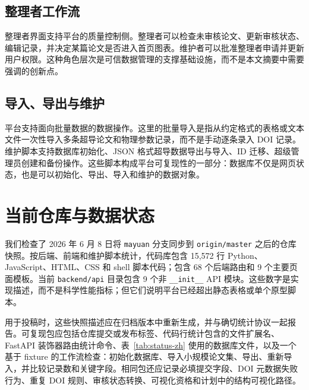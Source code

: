 \documentclass[11pt,a4paper]{ctexart}
\begin{document}
\subsection{整理者工作流}

整理者界面支持平台的质量控制侧。整理者可以检查未审核论文、更新审核状态、编辑记录，并决定某篇论文是否进入首页图表。维护者可以批准整理者申请并更新用户权限。这种角色层次是可信数据管理的支撑基础设施，而不是本文摘要中需要强调的创新点。

\subsection{导入、导出与维护}

平台支持面向批量数据的数据操作。这里的批量导入是指从约定格式的表格或文本文件一次性导入多条超导论文和物理参数记录，而不是手动逐条录入 DOI 记录。维护脚本支持数据库初始化、JSON 格式超导数据导出与导入、ID 迁移、超级管理员创建和备份操作。这些脚本构成平台可复现性的一部分：数据库不仅是网页状态，也是可以初始化、导出、导入和维护的数据对象。

\section{当前仓库与数据状态}

我们检查了 2026 年 6 月 8 日将 \texttt{mayuan} 分支同步到 \texttt{origin/master} 之后的仓库快照。按后端、前端和维护脚本统计，代码库包含 15,572 行 Python、JavaScript、HTML、CSS 和 shell 脚本代码；包含 68 个后端路由和 9 个主要页面模板。当前 \texttt{backend/api} 目录包含 9 个非 \texttt{\_\_init\_\_} API 模块。这些数字是实现描述，而不是科学性能指标；但它们说明平台已经超出静态表格或单个原型脚本。

用于投稿时，这些快照描述应在归档版本中重新生成，并与确切统计协议一起报告。可复现包应包括仓库提交或发布标签、代码行统计包含的文件扩展名、FastAPI 装饰器路由统计命令、表~\ref{tab:status-zh} 使用的数据库文件，以及一个基于 fixture 的工作流检查：初始化数据库、导入小规模论文集、导出、重新导入，并比较记录数和关键字段。相同包还应记录必填提交字段、DOI 元数据失败行为、重复 DOI 规则、审核状态转换、可视化资格和计划中的结构可视化路径。
\end{document}
